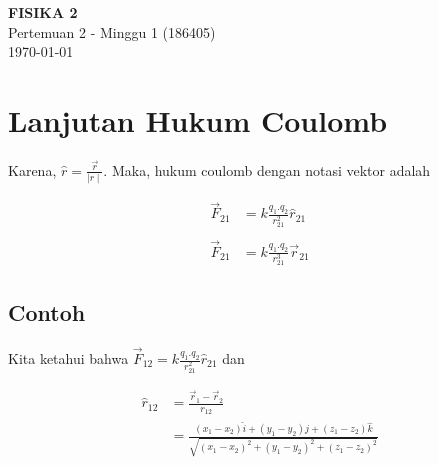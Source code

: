 \documentclass[twocolumn, 11pt]{article}%
\begin{document}
\begin{strip}
  \vspace*{\dimexpr-\stripsep}
  \begin{center}
      \Large\textbf{FISIKA 2}\\
      \large{Pertemuan 2 - Minggu 1 (186405)}\\
      \large{\today}
   \end{center}
\end{strip}

\section{Lanjutan Hukum Coulomb}
        \paragraph{ } Karena, $ \displaystyle \hat r = \frac{\vec r}{\mid r \mid} $. Maka, hukum coulomb dengan notasi vektor adalah

        \begin{equation*}
            \begin{split}
                \vec F_{21} &= k \frac{q_1 . q_2}{r_{21}^2} \hat r_{21}\\\\
                \vec F_{21} &= k \frac{q_1 . q_2}{r_{21}^3} \vec r_{21}
            \end{split}
        \end{equation*}

        \subsection{Contoh}
        \paragraph{ } Kita ketahui bahwa $ \displaystyle \vec F_{12} = k \frac{q_1 . q_2}{r_{21}^2} \hat r_{21} $ dan

        \begin{equation*}
            \begin{split}
                \hat r_{12} &= \frac{\vec r_1 - \vec r_2}{r_{12}}\\
                &=\frac{(x_1 - x_2)\hat i + (y_1 - y_2)\hat j + (z_1 - z_2)\hat k}{\sqrt{(x_1 - x_2)^2 + (y_1 - y_2)^2 + (z_1 - z_2)^2}}\\
            \end{split}
        \end{equation*}
\end{document}

